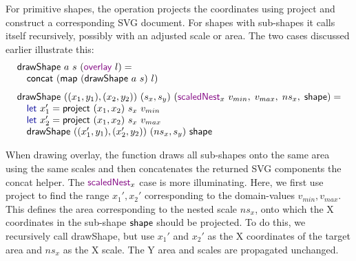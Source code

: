 \documentclass{jfp}
\newcommand{\ident}[1]{\textnormal{\textcolor{idclr}{\sffamily #1}}}
\newcommand{\kvd}[1]{\textnormal{\textcolor{kvdclr}{\sffamily #1}}}
\newcommand{\fkvd}[1]{\textnormal{\textcolor{fkvdclr}{\sffamily #1}}}
\begin{document}
\vspace{-1.25em}
\noindent
For primitive shapes, the operation projects the coordinates using \ident{project} and construct
a corresponding SVG document. For shapes with sub-shapes it calls itself recursively, possibly
with an adjusted scale or area. The two cases discussed earlier illustrate this:
%
\begin{equation*}
\begin{array}{l}
\ident{drawShape}~a~s~(\kvd{overlay}~l) = \\
\quad\ident{concat}~(\ident{map}~(\ident{drawShape}~a~s)~l)\\
\\[-0.5em]
\ident{drawShape}~((x_1, y_1), (x_2, y_2))~(s_x, s_y)~(\kvd{scaledNest}_x~v_{min},\;v_{max},\;{ns}_x,\;\ident{shape}) = \\
\quad\fkvd{let}~x_1' = \ident{project}~(x_1, x_2)~s_x~v_{min}\\
\quad\fkvd{let}~x_2' = \ident{project}~(x_1, x_2)~s_x~v_{max}\\
\quad\ident{drawShape}~((x_1', y_1), (x_2', y_2))~({ns}_x, s_y)~\ident{shape}\\
\end{array}
\end{equation*}

\vspace{-0.5em}
\noindent
When drawing \kvd{overlay}, the function draws all sub-shapes onto the same
area using the same scales and then concatenates the returned SVG components the \ident{concat} helper.
The $\kvd{scaledNest}_x$ case is more illuminating. Here, we first
use \ident{project} to find the range $x_1', x_2'$ corresponding to the domain-values
$v_{min},v_{max}$. This defines the area corresponding to the nested scale ${ns}_x$, onto
which the X coordinates in the sub-shape $\ident{shape}$ should be projected.
To do this, we recursively call \ident{drawShape}, but use $x_1'$ and $x_2'$ as the X coordinates
of the target area and ${ns}_x$ as the X scale. The Y area and scales are propagated unchanged.

\newpage
\end{document}
